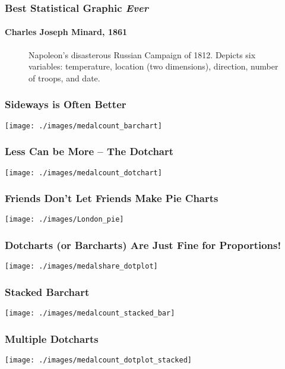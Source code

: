 \documentclass{beamer}
\begin{document}
\begin{frame}
\singlespacing
\frametitle{Best Statistical Graphic \emph{Ever}}
\framesubtitle{Charles Joseph Minard, 1861 }
\begin{figure}
\caption{Napoleon's disasterous Russian Campaign of 1812. Depicts six variables: temperature, location (two dimensions), direction, number of troops, and date.}
\end{figure}

\end{frame}



\begin{frame}
\frametitle{Sideways is Often Better}
\texttt{[image: ./images/medalcount\_barchart]}

\end{frame}

\begin{frame}
\frametitle{Less Can be More -- The Dotchart}
\texttt{[image: ./images/medalcount\_dotchart]}


\end{frame}

\begin{frame}
\frametitle{Friends Don't Let Friends Make Pie Charts}
\centering
\texttt{[image: ./images/London\_pie]}

\end{frame}



\begin{frame}
\frametitle{Dotcharts (or Barcharts) Are Just Fine for Proportions!}
\texttt{[image: ./images/medalshare\_dotplot]}

\end{frame}


\begin{frame}
\frametitle{Stacked Barchart}
\centering
\texttt{[image: ./images/medalcount\_stacked\_bar]}

\end{frame}


\begin{frame}
\frametitle{Multiple Dotcharts}
\centering
\texttt{[image: ./images/medalcount\_dotplot\_stacked]}

\end{frame}
\end{document}
